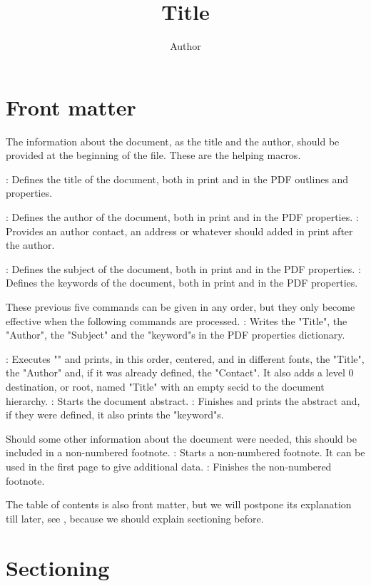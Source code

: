 \section{Front matter}

The information about the document, as the title and the author,
should be provided at the beginning of the file.
These are the helping macros.
\command\title{Title}: Defines the title
 of the document, both in print and in the PDF outlines and properties.
\command\author{Author}: Defines the author
 of the document, both in print and in the PDF properties.
\command{}: Provides an author contact, an address
 or whatever should added in print after the author.
\command\subject{Subject}: Defines the subject
 of the document, both in print and in the PDF properties.
\command{}: Defines the keywords
 of the document, both in print and in the PDF properties.

These previous five commands can be given in any order,
but they only become effective when the following commands
are processed.
\command\infodoc: Writes the "Title", the "Author",
the "Subject" and the "keyword"s in the PDF properties dictionary.
\command\maketitle: Executes "\infodoc" and prints,
in this order, centered, and in different fonts,
the "Title", the "Author"
and, if it was already defined, the "Contact".
It also adds a level 0 destination, or root,
named "Title" with an empty {\sc secid} to the document
hierarchy.
\command\beginabstract: Starts the document abstract.
\command\endabstract: Finishes and prints the abstract and,
 if they were defined, it also prints the "keyword"s.

Should some other information about the document were needed,
this should be included in a non-numbered footnote.
\command\beginnote: Starts a non-numbered footnote.
 It can be used in the first page to give additional data.
\command\endnote: Finishes the non-numbered footnote.

The table of contents is also front matter,
but we will postpone its explanation till later,
see ,
because we should explain sectioning before.


\section{Sectioning}


